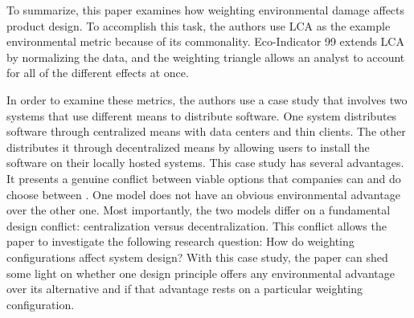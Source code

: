 \documentclass[final,journal,10pt,letterpaper,oneside,twocolumn,compsoc]%
{IEEEtran}
\begin{document}
To summarize, this paper examines how weighting environmental damage affects
product design. To accomplish this task, the authors use LCA
as the example environmental metric because of its commonality. Eco-Indicator 99
extends LCA by normalizing the data, and the weighting triangle allows an
analyst to account for all of the different effects at once.

In order to examine these metrics, the authors use a case study that involves
two systems that use different means to distribute software. One system
distributes software through centralized means with data centers and thin
clients. The other distributes it through decentralized means by allowing users
to install the software on their locally hosted systems. This case study has
several advantages. It presents a genuine conflict between viable options that
companies can and do choose between \cite{maga}. One model does not have an
obvious environmental advantage over the other one. Most importantly, the two
models differ on a fundamental design conflict: centralization versus
decentralization. This conflict allows the paper to investigate the following
research question: How do weighting configurations affect system design? With
this case study, the paper can shed some light on whether one design principle
offers any environmental advantage over its alternative and if that advantage
rests on a particular weighting configuration.




\end{document}
